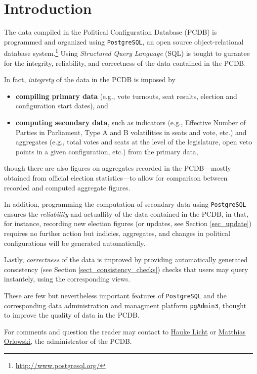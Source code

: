 \chapter{Introduction}\label{chap_introduction}

The data compiled in the Political Configuration Database (PCDB) is programmed and organized using \texttt{PostgreSQL}, an open source object-relational database system.\footnote{\url{http://www.postgresql.org/}} 
Using \emph{Structured Query Language} (SQL) is tought to gurantee for the integrity, reliability, and correctness of the data contained in the PCDB.

In fact, \emph{integrety} of the data in the PCDB is imposed by 
\begin{itemize}
\item[]\textbf{compiling primary data} (e.g., vote turnouts, seat results, election and configuration start dates), and \item[]\textbf{computing secondary data}, such as indicators (e.g., Effective Number of Parties in Parliament, Type A and B volatilities in seats and vote, etc.) and aggregates (e.g., total votes and seats at the level of the legislature, open veto points in a given configuration, etc.) from the primary data,
\end{itemize}
though there are also figures on aggregates recorded in the PCDB---mostly obtained from official election statistics---to allow for comparison between recorded and computed aggregate figures.

In addition, programming the computation of secondary data using \texttt{\txtfont PostgreSQL} ensures the \emph{reliability} and actuallity of the data contained in the PCDB, in that, for instance, recording new election figures (or updates, see Section \ref{sec_update}) requires no further action but indicies, aggregates, and changes in political configurations will be generated automatically.

Lastly, \emph{correctness} of the data is improved by providing automatically generated consistency (see Section \ref{sect_consistency_checks}) checks that users may query instantely, using the corresponding views. 

These are few but nevertheless important features of \texttt{\txtfont PostgreSQL} and the corresponding data administration and managment platform \texttt{\txtfont pgAdmin3}, thought to improve the quality of data in the PCDB.

For comments and question the reader may contact to \href{mailto:hauke.licht.1@hu-berlin.de}{Hauke Licht} or \href{mailto:matthias.orlowski@hu-berlin.de}{Matthias Orlowski}, the administrator of the PCDB.
